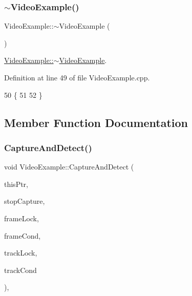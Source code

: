 \mbox{\label{class_video_example_a964cdd80f93a92c7a222fc7798df19b6}} 
\subsubsection{\texorpdfstring{$\sim$\+Video\+Example()}{~VideoExample()}}
{\footnotesize\ttfamily Video\+Example\+::$\sim$\+Video\+Example (\begin{DoxyParamCaption}{ }\end{DoxyParamCaption})\hspace{0.3cm}{\ttfamily [virtual]}}



\mbox{\hyperlink{class_video_example_a964cdd80f93a92c7a222fc7798df19b6}{Video\+Example\+::$\sim$\+Video\+Example}}. 



Definition at line 49 of file Video\+Example.\+cpp.


\begin{DoxyCode}
50 \{
51 
52 \}
\end{DoxyCode}


\subsection{Member Function Documentation}
\mbox{\label{class_video_example_ace8617201da40b6e230bd6c049b48aa0}} 
\subsubsection{\texorpdfstring{Capture\+And\+Detect()}{CaptureAndDetect()}}
{\footnotesize\ttfamily void Video\+Example\+::\+Capture\+And\+Detect (\begin{DoxyParamCaption}\item[{\mbox{\hyperlink{class_video_example}{Video\+Example}} $\ast$}]{this\+Ptr,  }\item[{bool $\ast$}]{stop\+Capture,  }\item[{std\+::mutex $\ast$}]{frame\+Lock,  }\item[{std\+::condition\+\_\+variable $\ast$}]{frame\+Cond,  }\item[{std\+::mutex $\ast$}]{track\+Lock,  }\item[{std\+::condition\+\_\+variable $\ast$}]{track\+Cond }\end{DoxyParamCaption})\hspace{0.3cm}{\ttfamily [static]}, {\ttfamily [protected]}}



